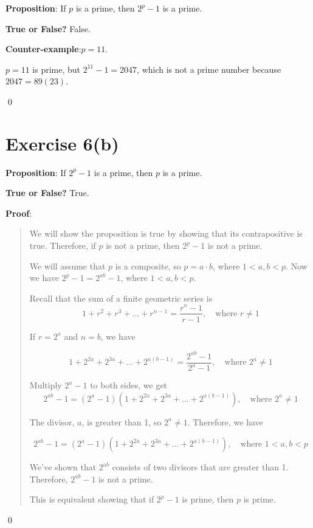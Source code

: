 \documentclass{article} %
\begin{document}
\bigskip
\noindent
\textbf{Proposition}: If $p$ is a prime, then $2^p - 1$ is a prime.

\bigskip
\noindent
\textbf{True or False?} False.

\bigskip
\noindent
\textbf{Counter-example}:$p = 11$.

$p = 11$ is prime, but $2^11 - 1 = 2047$, which is not a prime number because $2047 = 89(23)$.

\qed
\bigskip

\pagebreak
\section*{Exercise 6(b)}

\bigskip
\noindent
\textbf{Proposition}: If $2^p - 1$ is a prime, then $p$ is a prime.

\bigskip
\noindent
\textbf{True or False?} True.

\bigskip
\noindent
\textbf{Proof}:
\begin{quote}
    We will show the proposition is true by showing that its contrapositive is true.
    Therefore, if $p$ is not a prime, then $2^p - 1$ is not a prime.

    \bigskip
    We will assume that $p$ is a composite, so $p = a \cdot b$, where $1 < a, b < p$. Now we have $2^p - 1 = 2^{ab} - 1$, where $1 < a, b < p$.

    Recall that the sum of a finite geometric series is
    \[
        1 + r^2 + r^3 + \dots + r^{n - 1} = \frac{r^n - 1}{r - 1}, \quad \text{where } r \ne 1
    \]

    If $r = 2^a$ and $n = b$, we have

    \[
        1 + 2^{2a} + 2^{3a} + \dots + 2^{a(b - 1)} = \frac{2^{ab} - 1}{2^a - 1}, \quad \text{where } 2^a \ne 1
    \]

    Multiply $2^a - 1$ to both sides, we get
    \[
        2^{ab} - 1 = (2^a - 1)(1 + 2^{2a} + 2^{3a} + \dots + 2^{a(b - 1)}), \quad \text{where } 2^a \ne 1
    \]

    The divisor, $a$, is greater than 1, so $2^a \ne 1$. Therefore, we have

    \[2^{ab} - 1 = (2^a - 1)(1 + 2^{2a} + 2^{3a} + \dots + 2^{a(b - 1)}), \quad \text{where } 1 < a, b < p \]

    We've shown that $2^{ab}$ consists of two divisors that are greater than 1. Therefore, $2^{ab} - 1$ is not a prime.

    This is equivalent showing that if $2^p - 1$ is prime, then $p$ is prime.
\end{quote}
\qed
\bigskip
\end{document}
